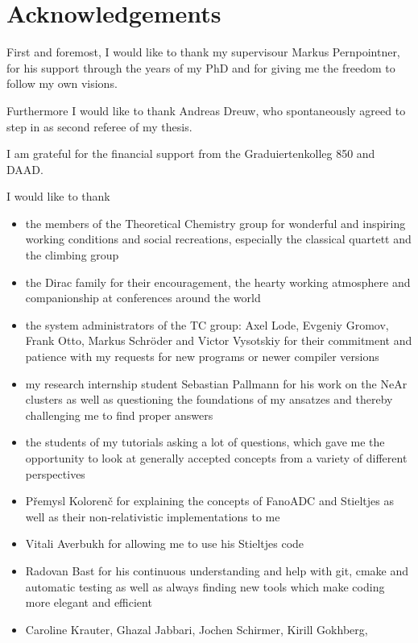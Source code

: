 \chapter*{Acknowledgements}

First and foremost, I would like to thank my supervisour Markus Pernpointner,
for his support through the years of my PhD and for giving me the freedom to
follow my own visions.

Furthermore I would like to thank Andreas Dreuw, who spontaneously agreed to
step in as second referee of my thesis.

I am grateful for the financial support from the Graduiertenkolleg 850 and DAAD.

I would like to thank
\begin{itemize}
 \item the members of the Theoretical Chemistry group for wonderful and
       inspiring working conditions and social recreations, especially
       the classical quartett and the climbing group
 \item the Dirac family for their encouragement, the hearty working
       atmosphere and companionship at conferences around the world
 \item the system administrators of the TC group:
       Axel Lode, Evgeniy Gromov, Frank Otto,
       Markus Schröder and Victor Vysotskiy for their commitment and patience
       with my requests for new programs or newer compiler versions
 \item my research internship student Sebastian Pallmann for his work
       on the NeAr clusters as well as questioning the foundations of my ansatzes
       and thereby challenging me to find proper answers
 \item the students of my tutorials asking a lot of questions, which gave
       me the opportunity to look at generally accepted concepts from
       a variety of different perspectives
 \item P\v{r}emysl Koloren\v{c} for explaining the concepts of FanoADC
       and Stieltjes as well as their non-relativistic implementations to me
 \item Vitali Averbukh for allowing me to use his Stieltjes code
 \item Radovan Bast for his continuous understanding and help with git,
       cmake and automatic testing as well as always finding 
       new tools which make coding more elegant and efficient
 \item Caroline Krauter, Ghazal Jabbari, Jochen Schirmer, Kirill Gokhberg,

\end{itemize}
